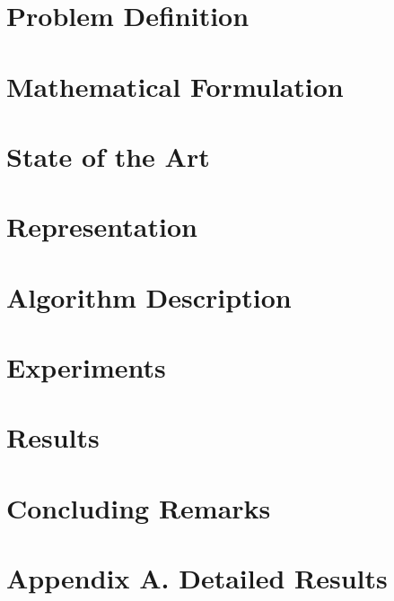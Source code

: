 \documentclass[letter, 10pt]{article}
\begin{document}
\newpage

\section{Problem Definition}


\newpage

\section{Mathematical Formulation}


\newpage

\section{State of the Art}


\newpage

\section{Representation}


\newpage

\section{Algorithm Description}


\newpage

\section{Experiments}


\newpage

\section{Results}


\newpage

\section{Concluding Remarks}


\section{Appendix A. Detailed Results}


\newpage



\end{document}
